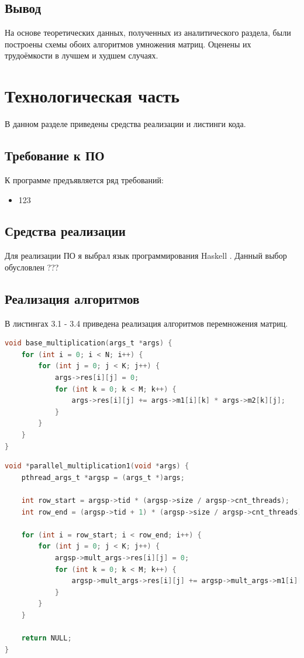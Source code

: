 \documentclass[12pt]{report}
\begin{document}
\section{Вывод}
	На основе теоретических данных, полученных из аналитического раздела, были построены схемы обоих алгоритмов умножения матриц.  Оценены их трудоёмкости в лучшем и худшем случаях.

\chapter{Технологическая часть}

В данном разделе приведены средства реализации и листинги кода.

\section{Требование к ПО}

К программе предъявляется ряд требований:

\begin{itemize}

	\item 123

\end{itemize}

\section{Средства реализации}
Для реализации ПО я выбрал язык программирования Haskell \cite{C}. Данный выбор обусловлен ???

\section{Реализация алгоритмов}

В листингах 3.1 - 3.4 приведена реализация алгоритмов перемножения матриц.

\begin{lstlisting}[label=some-code,caption=Функция умножения матриц обычным способом, language=C]
void base_multiplication(args_t *args) {
	for (int i = 0; i < N; i++) {
		for (int j = 0; j < K; j++) {
			args->res[i][j] = 0;
			for (int k = 0; k < M; k++) {
				args->res[i][j] += args->m1[i][k] * args->m2[k][j];
			}
		}
	}
}
\end{lstlisting}

\begin{lstlisting}[label=some-code,caption=Функция умножения матриц параллельно. Способ №1,language=C]
void *parallel_multiplication1(void *args) {
	pthread_args_t *argsp = (args_t *)args;

	int row_start = argsp->tid * (argsp->size / argsp->cnt_threads);
	int row_end = (argsp->tid + 1) * (argsp->size / argsp->cnt_threads);

	for (int i = row_start; i < row_end; i++) {
		for (int j = 0; j < K; j++) {
			argsp->mult_args->res[i][j] = 0;
			for (int k = 0; k < M; k++) {
				argsp->mult_args->res[i][j] += argsp->mult_args->m1[i][k] * argsp->mult_args->m2[k][j];
			}
		}
	}

	return NULL;
}

\end{lstlisting}
\end{document}
